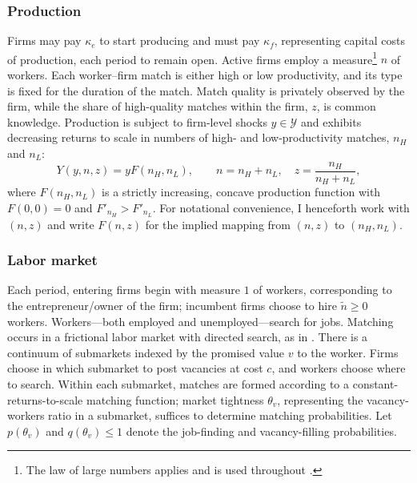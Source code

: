 \subsubsection*{Production}
Firms may pay $\kappa_e$ to start producing and must pay $\kappa_f$, representing capital costs of production, each period to remain open. Active firms employ a measure\footnote{The law of large numbers applies and is used throughout \parencite{Sun2009}.} $n$ of workers. Each worker–firm match is either high or low productivity, and its type is fixed for the duration of the match. Match quality is privately observed by the firm, while the share of high-quality matches within the firm, $z$, is common knowledge. Production is subject to firm-level shocks $y \in \mathcal{Y}$ and exhibits decreasing returns to scale in numbers of high- and low-productivity matches, $n_H$ and $n_L$:
\[
Y(y,n,z)=yF(n_H,n_L), \qquad n=n_H+n_L,\quad z=\frac{n_H}{n_H+n_L},
\]
where $F(n_H,n_L)$ is a strictly increasing, concave production function with $F(0,0)=0$ and $F'_{n_H}>F'_{n_L}$. For notational convenience, I henceforth work with $(n,z)$ and write $F(n,z)$ for the implied mapping from $(n,z)$ to $(n_H,n_L)$.

\subsubsection*{Labor market}  %
Each period, entering firms begin with  measure $1$ of workers, corresponding to the entrepreneur/owner of the firm; incumbent firms choose to hire $\tilde{n}\ge 0$ workers. Workers—both employed and unemployed—search for jobs. Matching occurs in a frictional labor market with directed search, as in \textcite{moen1997}. There is a continuum of submarkets indexed by the promised value $v$ to the worker. Firms choose in which submarket to post vacancies at cost $c$, and workers choose where to search. Within each submarket, matches are formed according to a constant-returns-to-scale matching function; market tightness $\theta_v$, representing the vacancy-workers ratio in a submarket, suffices to determine matching probabilities. Let $p(\theta_v)$ and $q(\theta_v)\le 1$ denote the job-finding and vacancy-filling probabilities.

